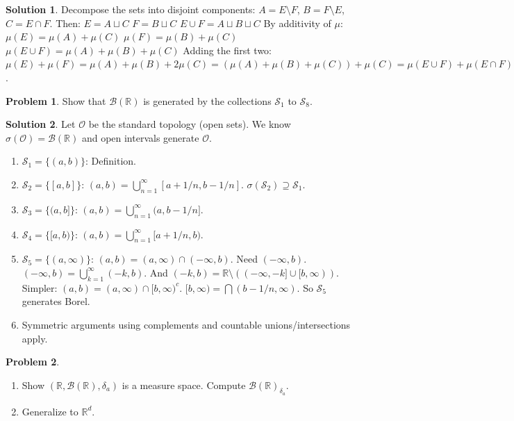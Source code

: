 \documentclass[11pt]{article}
\theoremstyle{definition}
\newtheorem{problem}{Problem}
\newtheorem*{solution}{Solution}
\newcommand{\R}{\mathbb{R}}
\renewcommand{\S}{\mathcal{S}}
\newcommand{\B}{\mathcal{B}}
\begin{document}
\begin{solution}
Decompose the sets into disjoint components:
$A = E \setminus F$, $B = F \setminus E$, $C = E \cap F$.
Then:
$E = A \sqcup C$
$F = B \sqcup C$
$E \cup F = A \sqcup B \sqcup C$
By additivity of $\mu$:
$\mu(E) = \mu(A) + \mu(C)$
$\mu(F) = \mu(B) + \mu(C)$
$\mu(E \cup F) = \mu(A) + \mu(B) + \mu(C)$
Adding the first two:
$\mu(E) + \mu(F) = \mu(A) + \mu(B) + 2\mu(C) = (\mu(A) + \mu(B) + \mu(C)) + \mu(C) = \mu(E \cup F) + \mu(E \cap F)$.
\end{solution}

\hrulefill

\begin{problem}
Show that $\B(\R)$ is generated by the collections $\S_1$ to $\S_8$.
\end{problem}

\begin{solution}
Let $\mathcal{O}$ be the standard topology (open sets). We know $\sigma(\mathcal{O}) = \B(\R)$ and open intervals generate $\mathcal{O}$.
\begin{enumerate}
    \item[(a)] $\S_1 = \{(a, b)\}$: Definition.
    \item[(b)] $\S_2 = \{[a, b]\}$: $(a, b) = \bigcup_{n=1}^\infty [a + 1/n, b - 1/n]$. $\sigma(\S_2) \supseteq \S_1$.
    \item[(c)] $\S_3 = \{(a, b]\}$: $(a, b) = \bigcup_{n=1}^\infty (a, b - 1/n]$.
    \item[(d)] $\S_4 = \{[a, b)\}$: $(a, b) = \bigcup_{n=1}^\infty [a + 1/n, b)$.
    \item[(e)] $\S_5 = \{(a, \infty)\}$: $(a, b) = (a, \infty) \cap (-\infty, b)$. Need $(-\infty, b)$.
    $(-\infty, b) = \bigcup_{k=1}^\infty (-k, b)$. And $(-k, b) = \R \setminus ((-\infty, -k] \cup [b, \infty))$.
    Simpler: $(a, b) = (a, \infty) \cap [b, \infty)^c$.
    $[b, \infty) = \bigcap (b-1/n, \infty)$.
    So $\S_5$ generates Borel.
    \item[(f)-(h)] Symmetric arguments using complements and countable unions/intersections apply.
\end{enumerate}
\end{solution}

\hrulefill

\begin{problem}
\begin{enumerate}
    \item Show $(\R, \B(\R), \delta_a)$ is a measure space. Compute $\B(\R)_{\delta_a}$.
    \item Generalize to $\R^d$.
\end{enumerate}
\end{problem}
\end{document}
